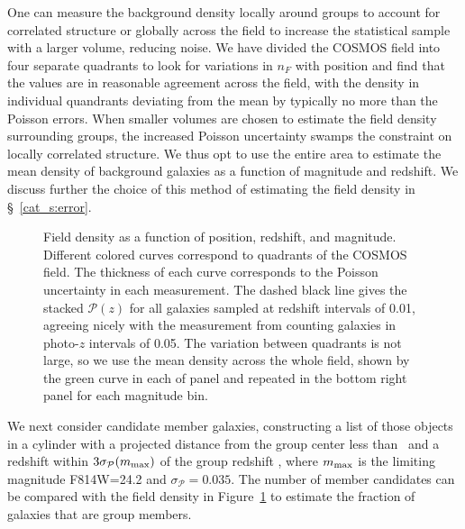 One can measure the background density locally around groups to
account for correlated structure or globally across the field to
increase the statistical sample with a larger volume, reducing
noise. We have divided the COSMOS field into four separate quadrants
to look for variations in $n_F$ with position and find that
the values are in reasonable agreement across the field, with
the density in individual quandrants deviating from the mean by typically
no more than the Poisson errors. When smaller volumes are chosen to estimate
the field density surrounding groups, the increased Poisson
uncertainty swamps the constraint on locally correlated structure. We
thus opt to use the entire area to estimate the mean density of
background galaxies as a function of magnitude and redshift. We
discuss further the choice of this method of estimating the field density
in \S~\ref{cat_s:error}.

\begin{figure}
\caption{Field density as a function of position, redshift, and
  magnitude. Different colored curves correspond to quadrants of the COSMOS
  field. The thickness of each curve corresponds to the Poisson
  uncertainty in each measurement. The dashed black line gives the
  stacked $\mathcal{P}(z)$ for all galaxies sampled at redshift
  intervals of 0.01, agreeing nicely with the measurement from
  counting galaxies in photo-$z$ intervals of 0.05. The variation between
  quadrants is not large, so we use the mean density across the whole
  field, shown by the green curve in each of panel and repeated in the
  bottom right panel for each magnitude bin.}
\label{cat_fig:fielddensity}
\end{figure}

We next consider candidate member galaxies, constructing a list of
those objects in a cylinder with a projected distance from the group center less
than \rvir\ and a redshift within $3\sigma_{\mathcal{P}}(m_{\rm max})$ of the
group redshift \zG, where $m_{\rm max}$ is the limiting magnitude
F814W=24.2 and $\sigma_{\mathcal{P}}=0.035$. The number of member
candidates can be compared with the field density in
Figure~\ref{cat_fig:fielddensity} to estimate the fraction of galaxies
that are group members.

